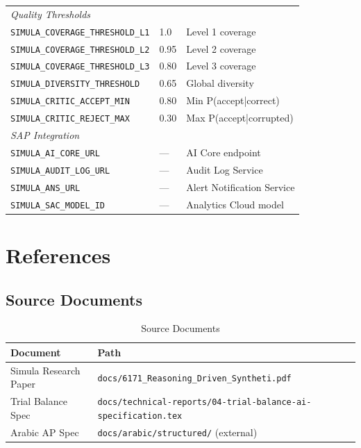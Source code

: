 \documentclass[12pt,a4paper,twoside]{report}
\begin{document}
\begin{table}[H]
\begin{tabularx}{\textwidth}{@{}l l X@{}}
\midrule
\multicolumn{3}{l}{\textit{Quality Thresholds}} \\
\texttt{SIMULA\_COVERAGE\_THRESHOLD\_L1} & 1.0 & Level 1 coverage \\
\texttt{SIMULA\_COVERAGE\_THRESHOLD\_L2} & 0.95 & Level 2 coverage \\
\texttt{SIMULA\_COVERAGE\_THRESHOLD\_L3} & 0.80 & Level 3 coverage \\
\texttt{SIMULA\_DIVERSITY\_THRESHOLD} & 0.65 & Global diversity \\
\texttt{SIMULA\_CRITIC\_ACCEPT\_MIN} & 0.80 & Min P(accept|correct) \\
\texttt{SIMULA\_CRITIC\_REJECT\_MAX} & 0.30 & Max P(accept|corrupted) \\
\midrule
\multicolumn{3}{l}{\textit{SAP Integration}} \\
\texttt{SIMULA\_AI\_CORE\_URL} & --- & AI Core endpoint \\
\texttt{SIMULA\_AUDIT\_LOG\_URL} & --- & Audit Log Service \\
\texttt{SIMULA\_ANS\_URL} & --- & Alert Notification Service \\
\texttt{SIMULA\_SAC\_MODEL\_ID} & --- & Analytics Cloud model \\
\bottomrule
\end{tabularx}
\end{table}
\chapter{References}
\label{chap:references}

\section{Source Documents}

\begin{table}[H]
\centering
\caption{Source Documents}
\begin{tabularx}{\textwidth}{lX}
\toprule
\textbf{Document} & \textbf{Path} \\
\midrule
Simula Research Paper & \texttt{docs/6171\_Reasoning\_Driven\_Syntheti.pdf} \\
Trial Balance Spec & \texttt{docs/technical-reports/04-trial-balance-ai-specification.tex} \\
Arabic AP Spec & \texttt{docs/arabic/structured/} (external) \\
\bottomrule
\end{tabularx}
\end{table}
\end{document}
